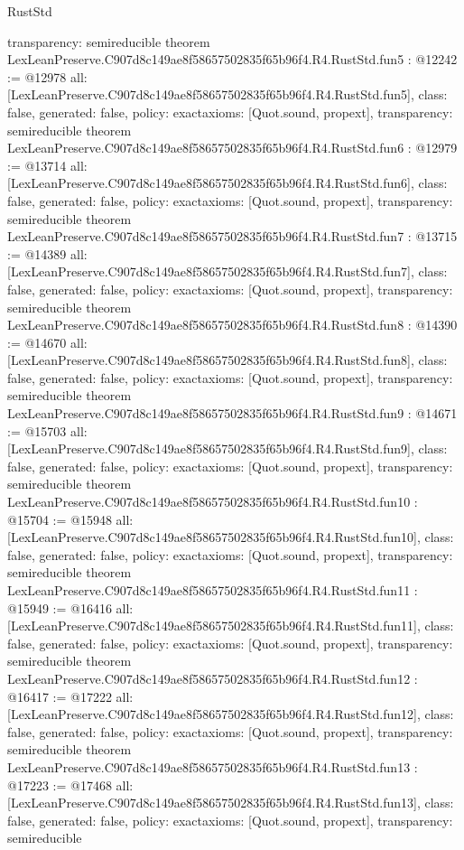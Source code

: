 \begin{lexlean}{RustStd}
\begin{coremodule}
{  transparency: semireducible
}
theorem LexLeanPreserve.C907d8c149ae8f58657502835f65b96f4.R4.RustStd.fun5 : @12242 := @12978 {
  all: [LexLeanPreserve.C907d8c149ae8f58657502835f65b96f4.R4.RustStd.fun5],
  class: false,
  generated: false,
  policy: exact{axioms: [Quot.sound, propext]},
  transparency: semireducible
}
theorem LexLeanPreserve.C907d8c149ae8f58657502835f65b96f4.R4.RustStd.fun6 : @12979 := @13714 {
  all: [LexLeanPreserve.C907d8c149ae8f58657502835f65b96f4.R4.RustStd.fun6],
  class: false,
  generated: false,
  policy: exact{axioms: [Quot.sound, propext]},
  transparency: semireducible
}
theorem LexLeanPreserve.C907d8c149ae8f58657502835f65b96f4.R4.RustStd.fun7 : @13715 := @14389 {
  all: [LexLeanPreserve.C907d8c149ae8f58657502835f65b96f4.R4.RustStd.fun7],
  class: false,
  generated: false,
  policy: exact{axioms: [Quot.sound, propext]},
  transparency: semireducible
}
theorem LexLeanPreserve.C907d8c149ae8f58657502835f65b96f4.R4.RustStd.fun8 : @14390 := @14670 {
  all: [LexLeanPreserve.C907d8c149ae8f58657502835f65b96f4.R4.RustStd.fun8],
  class: false,
  generated: false,
  policy: exact{axioms: [Quot.sound, propext]},
  transparency: semireducible
}
theorem LexLeanPreserve.C907d8c149ae8f58657502835f65b96f4.R4.RustStd.fun9 : @14671 := @15703 {
  all: [LexLeanPreserve.C907d8c149ae8f58657502835f65b96f4.R4.RustStd.fun9],
  class: false,
  generated: false,
  policy: exact{axioms: [Quot.sound, propext]},
  transparency: semireducible
}
theorem LexLeanPreserve.C907d8c149ae8f58657502835f65b96f4.R4.RustStd.fun10 : @15704 := @15948 {
  all: [LexLeanPreserve.C907d8c149ae8f58657502835f65b96f4.R4.RustStd.fun10],
  class: false,
  generated: false,
  policy: exact{axioms: [Quot.sound, propext]},
  transparency: semireducible
}
theorem LexLeanPreserve.C907d8c149ae8f58657502835f65b96f4.R4.RustStd.fun11 : @15949 := @16416 {
  all: [LexLeanPreserve.C907d8c149ae8f58657502835f65b96f4.R4.RustStd.fun11],
  class: false,
  generated: false,
  policy: exact{axioms: [Quot.sound, propext]},
  transparency: semireducible
}
theorem LexLeanPreserve.C907d8c149ae8f58657502835f65b96f4.R4.RustStd.fun12 : @16417 := @17222 {
  all: [LexLeanPreserve.C907d8c149ae8f58657502835f65b96f4.R4.RustStd.fun12],
  class: false,
  generated: false,
  policy: exact{axioms: [Quot.sound, propext]},
  transparency: semireducible
}
theorem LexLeanPreserve.C907d8c149ae8f58657502835f65b96f4.R4.RustStd.fun13 : @17223 := @17468 {
  all: [LexLeanPreserve.C907d8c149ae8f58657502835f65b96f4.R4.RustStd.fun13],
  class: false,
  generated: false,
  policy: exact{axioms: [Quot.sound, propext]},
  transparency: semireducible
}
\end{coremodule}
\end{lexlean}
